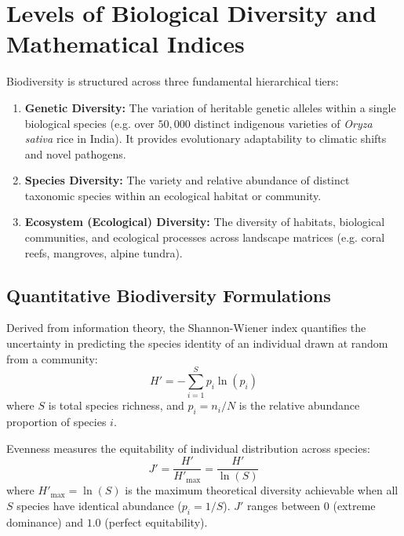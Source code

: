 \section{Levels of Biological Diversity and Mathematical Indices}
Biodiversity is structured across three fundamental hierarchical tiers:
\begin{enumerate}[leftmargin=1.5em]
    \item \textbf{Genetic Diversity:} The variation of heritable genetic alleles within a single biological species (e.g. over $50{,}000$ distinct indigenous varieties of \textit{Oryza sativa} rice in India). It provides evolutionary adaptability to climatic shifts and novel pathogens.
    \item \textbf{Species Diversity:} The variety and relative abundance of distinct taxonomic species within an ecological habitat or community.
    \item \textbf{Ecosystem (Ecological) Diversity:} The diversity of habitats, biological communities, and ecological processes across landscape matrices (e.g. coral reefs, mangroves, alpine tundra).
\end{enumerate}

\subsection{Quantitative Biodiversity Formulations}
\begin{keyequation}
Derived from information theory, the Shannon-Wiener index quantifies the uncertainty in predicting the species identity of an individual drawn at random from a community:
\begin{equation}
H' = -\sum_{i=1}^S p_i \ln(p_i)
\end{equation}
where $S$ is total species richness, and $p_i = n_i / N$ is the relative abundance proportion of species $i$.
\end{keyequation}

\begin{keyequation}
Evenness measures the equitability of individual distribution across species:
\begin{equation}
J' = \frac{H'}{H'_{\text{max}}} = \frac{H'}{\ln(S)}
\end{equation}
where $H'_{\text{max}} = \ln(S)$ is the maximum theoretical diversity achievable when all $S$ species have identical abundance ($p_i = 1/S$). $J'$ ranges between $0$ (extreme dominance) and $1.0$ (perfect equitability).
\end{keyequation}

